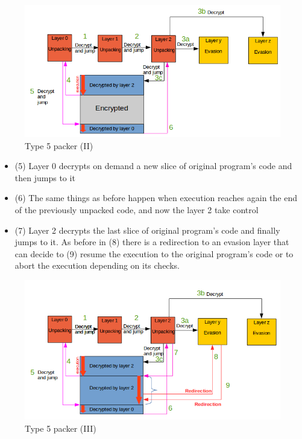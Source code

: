 \begin{figure}[!ht]
	\begin{center}
   		\includegraphics[width=\textwidth]{pictures/packer_type_5-2.png}
	\end{center}
	\caption{Type 5 packer (II)}
\end{figure}
\begin{itemize}
\item (5) Layer 0 decrypts on demand a new slice of original program's code and then jumps to it
\item (6) The same things as before happen when execution reaches again the end of the previously unpacked code, and now the layer 2 take control
\item (7) Layer 2 decrypts the last slice of original program's code and finally jumps to it. As before in (8) there is a redirection to an evasion layer that can decide to (9) resume the execution to the original program's code or to abort the execution depending on its checks.
\end{itemize}
\begin{figure}[!ht]
	\begin{center}
   		\includegraphics[width=\textwidth]{pictures/packer_type_5-3.png}
	\end{center}
	\caption{Type 5 packer (III)}
\end{figure}

